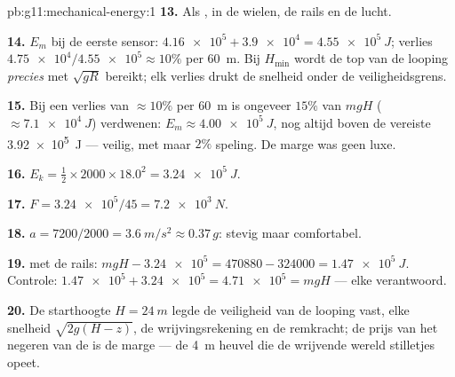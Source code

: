 \begin{solution}{pb:g11:mechanical-energy:1}
\textbf{13.} Als , in de wielen, de rails en de lucht.

\textbf{14.} $E_m$ bij de eerste sensor: $\num{4.16e5} + \num{3.9e4} =
\qty{4.55e5}{J}$; verlies $\num{4.75e4}/\num{4.55e5} \approx 10\%$ per
\qty{60}{m}. Bij $H_{\min}$ wordt de top van de looping \emph{precies}
met $\sqrt{gR}$ bereikt; elk verlies drukt de snelheid onder de
veiligheidsgrens.

\textbf{15.} Bij een verlies van $\approx 10\%$ per \qty{60}{m} is
ongeveer $15\%$ van $mgH$ ($\approx \qty{7.1e4}{J}$) verdwenen:
$E_m \approx \qty{4.00e5}{J}$, nog altijd boven de vereiste
\qty{3.92e5}{J} --- veilig, met maar $2\%$ speling. De marge was geen
luxe.

\textbf{16.} $E_k = \tfrac12 \times 2000 \times 18.0^2 =
\qty{3.24e5}{J}$.

\textbf{17.} $F = \num{3.24e5}/45 = \qty{7.2e3}{N}$.

\textbf{18.} $a = 7200/2000 = \qty{3.6}{m/s^2} \approx 0.37\,g$: stevig
maar comfortabel.

\textbf{19.}  met de rails: $mgH - \num{3.24e5} = \num{470880} -
\num{324000} = \qty{1.47e5}{J}$. Controle:
$\num{1.47e5} + \num{3.24e5} = \num{4.71e5} = mgH$ --- elke 
verantwoord.

\textbf{20.} De starthoogte $H = \qty{24}{m}$ legde de veiligheid van de
looping vast, elke snelheid $\sqrt{2g(H - z)}$, de wrijvingsrekening en
de remkracht; de prijs van het negeren van de  is de marge --- de
\qty{4}{m} heuvel die de wrijvende wereld stilletjes opeet.
\end{solution}
